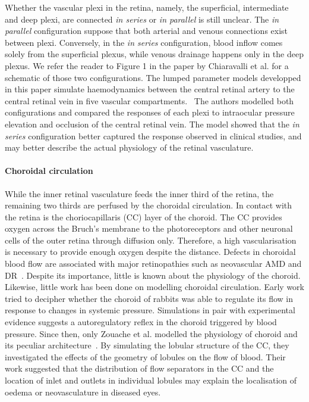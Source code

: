 \documentclass{article}
\begin{document}
Whether the vascular plexi in the retina, namely, the superficial, intermediate and deep plexi, are connected \textit{in series} or \textit{in parallel} is still unclear.
The \textit{in parallel} configuration suppose that both arterial and venous connections exist between plexi.
Conversely, in the \textit{in series} configuration, blood inflow comes solely from the superficial plexus, while venous drainage happens only in the deep plexus.
We refer the reader to Figure 1 in the paper by Chiaravalli et al. for a schematic of those two configurations.\cite{Chiaravalli_2021}
The lumped parameter models developped in this paper simulate haemodynamics between the central retinal artery to the central retinal vein in five vascular compartments.~\cite{Chiaravalli_2021}
The authors modelled both configurations and compared the responses of each plexi to intraocular pressure elevation and occlusion of the central retinal vein.
The model showed that the \textit{in series} configuration better captured the response observed in clinical studies, and may better describe the actual physiology of the retinal vasculature.

\paragraph*{Choroidal circulation}
While the inner retinal vasculature feeds the inner third of the retina, the remaining two thirds are perfused by the choroidal circulation.
In contact with the retina is the choriocapillaris (CC) layer of the choroid.
The CC provides oxygen across the Bruch's membrane to the photoreceptors and other neuronal cells of the outer retina through diffusion only.
Therefore, a high vascularisation is necessary to provide enough oxygen despite the distance.
Defects in choroidal blood flow are associated with major retinopathies such as neovascular AMD and DR~\cite{Pemp_2008}.
Despite its importance, little is known about the physiology of the choroid.
Likewise, little work has been done on modelling choroidal circulation.
Early work tried to decipher whether the choroid of rabbits was able to regulate its flow in response to changes in systemic pressure.\cite{Kiel_1992}
Simulations in pair with experimental evidence suggests a autoregulatory reflex in the choroid triggered by blood pressure.
Since then, only Zouache et al. modelled the physiology of choroid and its peculiar architecture~\cite{Zouache_2015}.
By simulating the lobular structure of the CC, they investigated the effects of the geometry of lobules on the flow of blood.
Their work suggested that the distribution of flow separators in the CC and the location of inlet and outlets in individual lobules may explain the localisation of oedema or neovasculature in diseased eyes.\cite{Zouache_2015}
\end{document}
